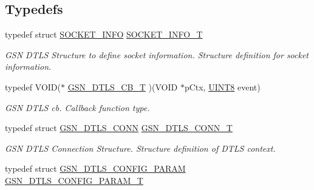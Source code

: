 \subsection*{Typedefs}
\begin{DoxyCompactItemize}
\item 
typedef struct \hyperlink{a00460}{SOCKET\_\-INFO} \hyperlink{a00487_a8218fb3cf5e30d88bc41ef9985ff24dd}{SOCKET\_\-INFO\_\-T}
\begin{DoxyCompactList}\small\item\em GSN DTLS Structure to define socket information. Structure definition for socket information. \end{DoxyCompactList}\item 
typedef VOID($\ast$ \hyperlink{a00487_a5d2b26f5083cf0fda1a5356fe26ad9c3}{GSN\_\-DTLS\_\-CB\_\-T} )(VOID $\ast$pCtx, \hyperlink{a00660_gab27e9918b538ce9d8ca692479b375b6a}{UINT8} event)
\begin{DoxyCompactList}\small\item\em GSN DTLS cb. Callback function type. \end{DoxyCompactList}\item 
typedef struct \hyperlink{a00057}{GSN\_\-DTLS\_\-CONN} \hyperlink{a00487_a00df65ee6cb0fc35ab9eb7a55d7d5aef}{GSN\_\-DTLS\_\-CONN\_\-T}
\begin{DoxyCompactList}\small\item\em GSN DTLS Connection Structure. Structure definition of DTLS context. \end{DoxyCompactList}\item 
typedef struct \hyperlink{a00056}{GSN\_\-DTLS\_\-CONFIG\_\-PARAM} \hyperlink{a00487_ae3680440931131b5203c5e0217bfec16}{GSN\_\-DTLS\_\-CONFIG\_\-PARAM\_\-T}
\end{DoxyCompactItemize}
